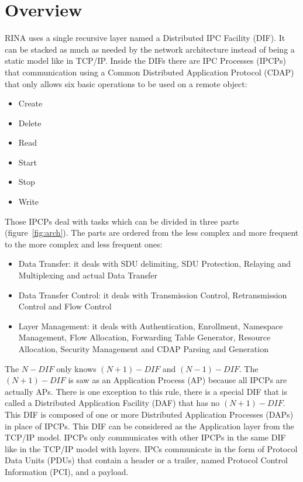 \documentclass[a4paper]{proc}
\begin{document}
\section{Overview}
RINA uses a single recursive layer named a Distributed IPC Facility (DIF). It can be stacked as much as needed by the network architecture instead of being a static model like in TCP/IP\@.
Inside the DIFs there are IPC Processes (IPCPs) that communication using a Common Distributed Application Protocol (CDAP) that only allows six basic operations to be used on a remote object\cite{wiki}:
\begin{itemize}
    \item Create
    \item Delete
    \item Read
    \item Start
    \item Stop
    \item Write
\end{itemize}
Those IPCPs deal with tasks which can be divided in three parts (figure~\ref{fig:arch}).
The parts are ordered from the less complex and more frequent to the more complex and less frequent ones:
\begin{itemize}
    \item Data Transfer: it deals with SDU delimiting, SDU Protection, Relaying and Multiplexing and actual Data Transfer
    \item Data Transfer Control: it deals with Transmission Control, Retransmission Control and Flow Control
    \item Layer Management: it deals with Authentication, Enrollment, Namespace Management, Flow Allocation, Forwarding Table Generator, Resource Allocation, Security Management and CDAP Parsing and Generation
\end{itemize}
The $N-DIF$ only knows $(N + 1)-DIF$ and $(N - 1)-DIF$\@.
The $(N + 1)-DIF$ is saw as an Application Process (AP) because all IPCPs are actually APs.
There is one exception to this rule, there is a special DIF that is called a Distributed Application Facility (DAF) that has no $(N + 1)-DIF$\@.
This DIF is composed of one or more Distributed Application Processes (DAPs) in place of IPCPs.
This DIF can be considered as the Application layer from the TCP/IP model.
IPCPs only communicates with other IPCPs in the same DIF like in the TCP/IP model with layers.
IPCs communicate in the form of Protocol Data Units (PDUs) that contain a header or a trailer, named Protocol Control Information (PCI), and a payload.
\end{document}
